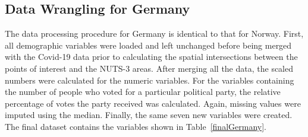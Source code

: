 \subsection{Data Wrangling for Germany}
The data processing procedure for Germany is identical to that for Norway. First, all demographic variables were loaded and left unchanged before being merged with the Covid-19 data prior to calculating the spatial intersections between the points of interest and the NUTS-3 areas. After merging all the data, the scaled numbers were calculated for the numeric variables. For the variables containing the number of people who voted for a particular political party, the relative percentage of votes the party received was calculated. Again, missing values were imputed using the median.
Finally, the same seven new variables were created. 
The final dataset contains the variables shown in Table~\ref{finalGermany}.
